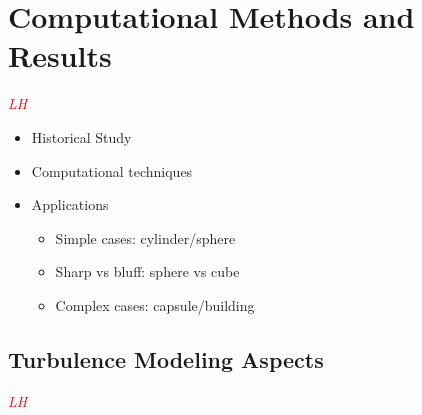 \documentclass[journal]{new-aiaa}
\begin{document}
\section{Computational Methods and Results} \label{sec:computationalmethods}

\textcolor{red}{\emph{LH}}

\begin{itemize}
    \item Historical Study
    \item Computational techniques
    \item Applications
    \begin{itemize}
        \item Simple cases: cylinder/sphere
        \item Sharp vs bluff: sphere vs cube
        \item Complex cases: capsule/building
    \end{itemize}
\end{itemize}

\subsection{Turbulence Modeling Aspects} \label{subsec:turbulencemodeling}

\textcolor{red}{\emph{LH}}
\end{document}
